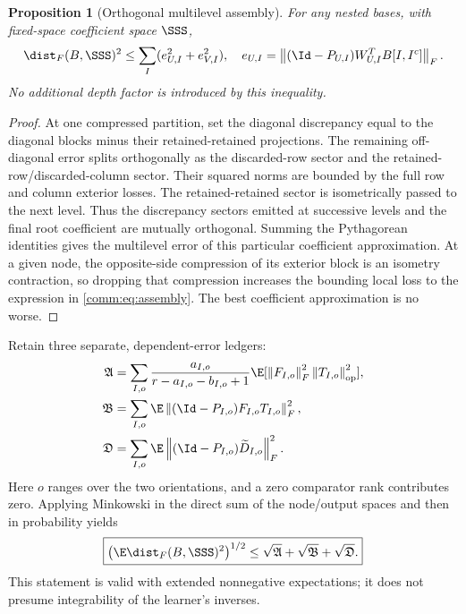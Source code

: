 \documentclass[11pt,oneside,openany,a4paper]{book}
\numberwithin{equation}{chapter}
\newtheorem{proposition}[theorem]{Proposition}
\theoremstyle{definition}
\theoremstyle{remark}
\newcommand{\F}[1]{\left\lVert#1\right\rVert_F}
\newcommand{\op}[1]{\left\lVert#1\right\rVert_{\rm op}}
\begin{document}
\begin{proposition}[Orthogonal multilevel assembly]\label{comm:prop:assembly}
For any nested bases, with fixed-space coefficient space $\SSS$,
\begin{equation}\label{comm:eq:assembly}
 \dist_F(B,\SSS)^2\le\sum_I(e_{U,I}^2+e_{V,I}^2),
 \quad e_{U,I}=\F{(\Id-P_{U,I})W_{U,I}^TB[I,I^c]}.
\end{equation}
No additional depth factor is introduced by this inequality.
\end{proposition}
\begin{proof}
At one compressed partition, set the diagonal discrepancy equal to the diagonal blocks minus their retained-retained projections. The remaining off-diagonal error splits orthogonally as the discarded-row sector and the retained-row/discarded-column sector. Their squared norms are bounded by the full row and column exterior losses. The retained-retained sector is isometrically passed to the next level. Thus the discrepancy sectors emitted at successive levels and the final root coefficient are mutually orthogonal. Summing the Pythagorean identities gives the multilevel error of this particular coefficient approximation. At a given node, the opposite-side compression of its exterior block is an isometry contraction, so dropping that compression increases the bounding local loss to the expression in \eqref{comm:eq:assembly}. The best coefficient approximation is no worse.
\end{proof}

Retain three separate, dependent-error ledgers:
\begin{align}
 \mathfrak A&=\sum_{I,o}\frac{a_{I,o}}{r-a_{I,o}-b_{I,o}+1}
             \E[\F{F_{I,o}}^2\op{T_{I,o}}^2],\label{comm:eq:Aledger}\\
 \mathfrak B&=\sum_{I,o}\E\F{(\Id-P_{I,o})F_{I,o}T_{I,o}}^2,\label{comm:eq:Bledger}\\
 \mathfrak D&=\sum_{I,o}\E\F{(\Id-P_{I,o})\widetilde D_{I,o}}^2.\label{comm:eq:Dledger}
\end{align}
Here $o$ ranges over the two orientations, and a zero comparator rank contributes zero. Applying Minkowski in the direct sum of the node/output spaces and then in probability yields
\begin{equation}\label{comm:eq:three}
 \boxed{\bigl(\E\dist_F(B,\SSS)^2\bigr)^{1/2}
 \le\sqrt{\mathfrak A}+\sqrt{\mathfrak B}+\sqrt{\mathfrak D}.}
\end{equation}
This statement is valid with extended nonnegative expectations; it does not presume integrability of the learner's inverses.
\end{document}
